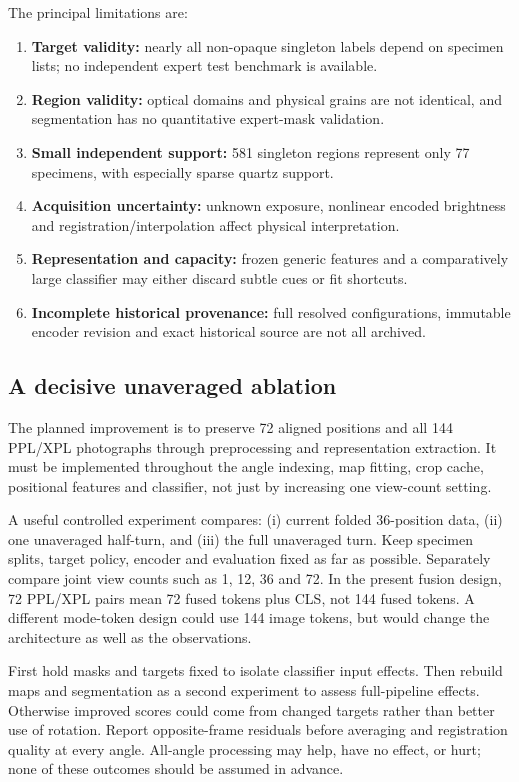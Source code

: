 The principal limitations are:
\begin{enumerate}
\item \textbf{Target validity:} nearly all non-opaque singleton labels depend on specimen lists; no independent expert test benchmark is available.
\item \textbf{Region validity:} optical domains and physical grains are not identical, and segmentation has no quantitative expert-mask validation.
\item \textbf{Small independent support:} 581 singleton regions represent only 77 specimens, with especially sparse quartz support.
\item \textbf{Acquisition uncertainty:} unknown exposure, nonlinear encoded brightness and registration/interpolation affect physical interpretation.
\item \textbf{Representation and capacity:} frozen generic features and a comparatively large classifier may either discard subtle cues or fit shortcuts.
\item \textbf{Incomplete historical provenance:} full resolved configurations, immutable encoder revision and exact historical source are not all archived.
\end{enumerate}

\subsection{A decisive unaveraged ablation}
The planned improvement is to preserve 72 aligned positions and all 144 PPL/XPL photographs through preprocessing and representation extraction. It must be implemented throughout the angle indexing, map fitting, crop cache, positional features and classifier, not just by increasing one view-count setting.

A useful controlled experiment compares: (i) current folded 36-position data, (ii) one unaveraged half-turn, and (iii) the full unaveraged turn. Keep specimen splits, target policy, encoder and evaluation fixed as far as possible. Separately compare joint view counts such as 1, 12, 36 and 72. In the present fusion design, 72 PPL/XPL pairs mean 72 fused tokens plus CLS, not 144 fused tokens. A different mode-token design could use 144 image tokens, but would change the architecture as well as the observations.

First hold masks and targets fixed to isolate classifier input effects. Then rebuild maps and segmentation as a second experiment to assess full-pipeline effects. Otherwise improved scores could come from changed targets rather than better use of rotation. Report opposite-frame residuals before averaging and registration quality at every angle. All-angle processing may help, have no effect, or hurt; none of these outcomes should be assumed in advance.

